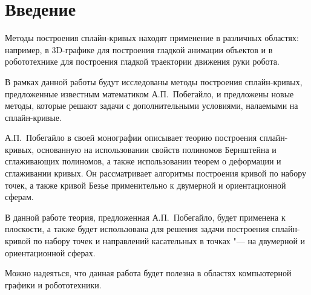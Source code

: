 \chapter*{Введение}

Методы построения сплайн-кривых находят применение в различных областях: например, в 3D-графике для построения гладкой
анимации объектов и в робототехнике для построения гладкой траектории движения руки робота.

В рамках данной работы будут исследованы методы построения сплайн-кривых, предложенные известным математиком
А.П.~Побегайло, и предложены новые методы, которые решают задачи с дополнительными условиями, налаемыми на
сплайн-кривые.

А.П.~Побегайло в своей монографии \cite{pobegaylo} описывает теорию построения сплайн-кривых, основанную на
использовании свойств полиномов Бернштейна и сглаживающих полиномов, а также использовании теорем о деформации и
сглаживании кривых. Он рассматривает алгоритмы построения кривой по набору точек, а также кривой Безье применительно
к двумерной и ориентационной сферам.

В данной работе теория, предложенная А.П.~Побегайло, будет применена к плоскости, а также будет использована для
решения задачи построения сплайн-кривой по набору точек и направлений касательных в точках "--- на двумерной и
ориентационной сферах.

Можно надеяться, что данная работа будет полезна в областях компьютерной графики и робототехники.
